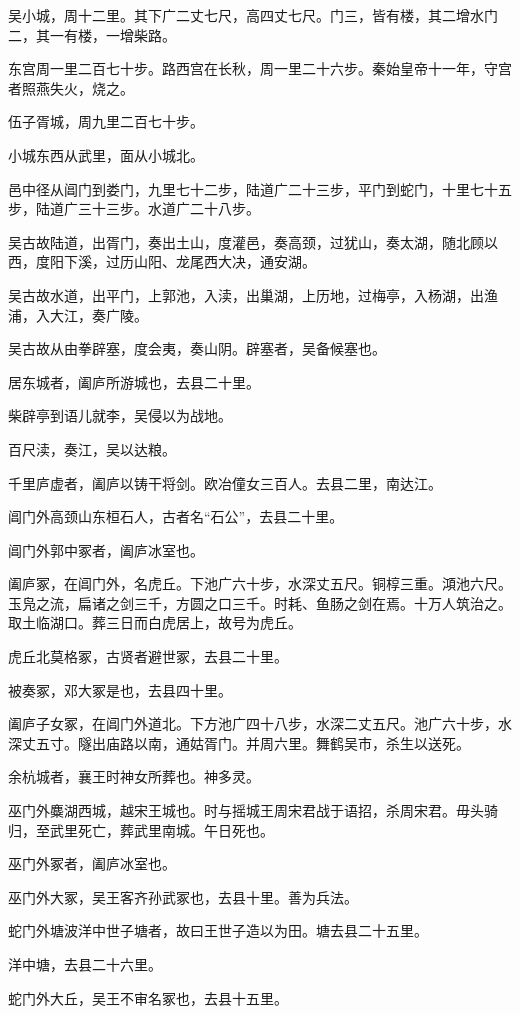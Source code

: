 \documentclass[12pt,UTF8]{ctexbook}
\begin{document}
吴小城，周十二里。其下广二丈七尺，高四丈七尺。门三，皆有楼，其二增水门二，其一有楼，一增柴路。

东宫周一里二百七十步。路西宫在长秋，周一里二十六步。秦始皇帝十一年，守宫者照燕失火，烧之。

伍子胥城，周九里二百七十步。

小城东西从武里，面从小城北。

邑中径从阊门到娄门，九里七十二步，陆道广二十三步，平门到蛇门，十里七十五步，陆道广三十三步。水道广二十八步。

吴古故陆道，出胥门，奏出土山，度灌邑，奏高颈，过犹山，奏太湖，随北顾以西，度阳下溪，过历山阳、龙尾西大决，通安湖。

吴古故水道，出平门，上郭池，入渎，出巢湖，上历地，过梅亭，入杨湖，出渔浦，入大江，奏广陵。

吴古故从由拳辟塞，度会夷，奏山阴。辟塞者，吴备候塞也。

居东城者，阖庐所游城也，去县二十里。

柴辟亭到语儿就李，吴侵以为战地。

百尺渎，奏江，吴以达粮。

千里庐虚者，阖庐以铸干将剑。欧冶僮女三百人。去县二里，南达江。

阊门外高颈山东桓石人，古者名“石公”，去县二十里。

阊门外郭中冢者，阖庐冰室也。

阖庐冢，在阊门外，名虎丘。下池广六十步，水深丈五尺。铜椁三重。澒池六尺。玉凫之流，扁诸之剑三千，方圆之口三千。时耗、鱼肠之剑在焉。十万人筑治之。取土临湖口。葬三日而白虎居上，故号为虎丘。

虎丘北莫格冢，古贤者避世冢，去县二十里。

被奏冢，邓大冢是也，去县四十里。

阖庐子女冢，在阊门外道北。下方池广四十八步，水深二丈五尺。池广六十步，水深丈五寸。隧出庙路以南，通姑胥门。并周六里。舞鹤吴市，杀生以送死。

余杭城者，襄王时神女所葬也。神多灵。

巫门外麋湖西城，越宋王城也。时与摇城王周宋君战于语招，杀周宋君。毋头骑归，至武里死亡，葬武里南城。午日死也。

巫门外冢者，阖庐冰室也。

巫门外大冢，吴王客齐孙武冢也，去县十里。善为兵法。

蛇门外塘波洋中世子塘者，故曰王世子造以为田。塘去县二十五里。

洋中塘，去县二十六里。

蛇门外大丘，吴王不审名冢也，去县十五里。
\end{document}
